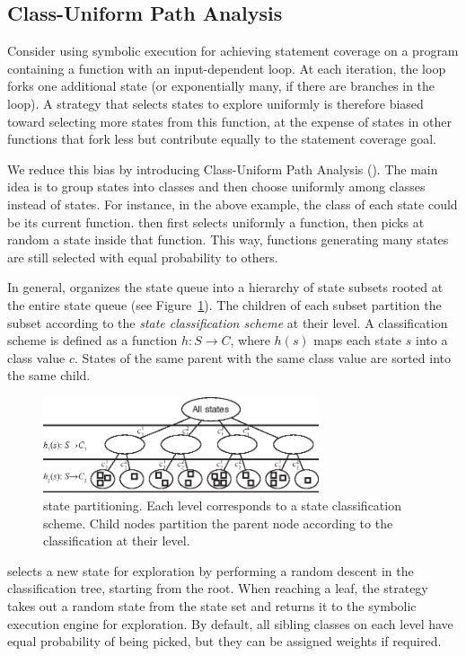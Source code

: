 
\subsection{Class-Uniform Path Analysis}

Consider using symbolic execution for achieving statement coverage on a program containing a function with an input-dependent loop.  At each iteration, the loop forks one additional state (or exponentially many, if there are branches in the loop). A strategy that selects states to explore uniformly is therefore biased toward selecting more states from this function, at the expense of states in other functions that fork less but contribute equally to the statement coverage goal.

We reduce this bias by introducing Class-Uniform Path Analysis (\cupa).
%
The main idea is to group states into classes and then choose uniformly among classes instead of states.  For instance, in the above example, the class of each state could be its current function.  \cupa then first selects uniformly a function, then picks at random a state inside that function.  This way, functions generating many states are still selected with equal probability to others.

In general, \cupa organizes the state queue into a hierarchy of state subsets rooted at the entire state queue (see Figure~\ref{fig:cupa}).  The children of each subset partition the subset according to the \emph{state classification scheme} at their level.  A classification scheme is defined as a function $h: S \rightarrow C$, where $h(s)$ maps each state $s$ into a class value $c$.  States of the same parent with the same class value are sorted into the same child.
%
\begin{figure}
  \centering
  \includegraphics[width=3.2in]{figures/cupa/cupa}
  \caption{\cupa state partitioning.  Each level corresponds to a state classification scheme.  Child nodes partition the parent node according to the classification at their level.}
  \label{fig:cupa}
\end{figure}
%
\cupa selects a new state for exploration by performing a random descent in the classification tree, starting from the root.  When reaching a leaf, the strategy takes out a random state from the state set and returns it to the symbolic execution engine for exploration.  By default, all sibling classes on each level have equal probability of being picked, but they can be assigned weights if required.

